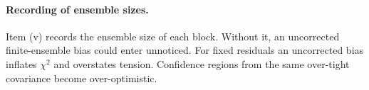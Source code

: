 \paragraph{Recording of ensemble sizes.} Item (v) records the ensemble size of each block. Without it, an uncorrected finite-ensemble bias could enter unnoticed. For fixed residuals an uncorrected bias inflates $\chi^{2}$ and overstates tension. Confidence regions from the same over-tight covariance become over-optimistic.

